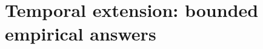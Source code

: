 \documentclass[11pt]{article}
\begin{document}
\section{Temporal extension: bounded empirical answers}


\end{document}
